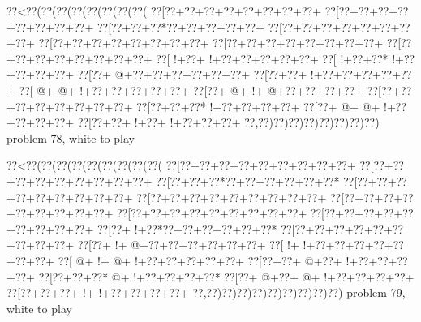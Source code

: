 \vbox{\vbox{\goo
\0??<\0??(\0??(\0??(\0??(\0??(\0??(\0??(\0??(
\0??[\0??+\0??+\0??+\0??+\0??+\0??+\0??+\0??+
\0??[\0??+\0??+\0??+\0??+\0??+\0??+\0??+\0??+
\0??[\0??+\0??+\0??*\0??+\0??+\0??+\0??+\0??+
\0??[\0??+\0??+\0??+\0??+\0??+\0??+\0??+\0??+
\0??[\0??+\0??+\0??+\0??+\0??+\0??+\0??+\0??+
\0??[\0??+\0??+\0??+\0??+\0??+\0??+\0??+\0??+
\0??[\0??+\0??+\0??+\0??+\0??+\0??+\0??+\0??+
\0??[\- !+\0??+\- !+\0??+\0??+\0??+\0??+\0??+
\0??[\- !+\0??+\0??*\- !+\0??+\0??+\0??+\0??+
\0??[\0??+\- @+\0??+\0??+\0??+\0??+\0??+\0??+
\0??[\0??+\0??+\- !+\0??+\0??+\0??+\0??+\0??+
\0??[\- @+\- @+\- !+\0??+\0??+\0??+\0??+\0??+
\0??[\0??+\- @+\- !+\- @+\0??+\0??+\0??+\0??+
\0??[\0??+\0??+\0??+\0??+\0??+\0??+\0??+\0??+
\0??[\0??+\0??+\0??*\- !+\0??+\0??+\0??+\0??+
\0??[\0??+\- @+\- @+\- !+\0??+\0??+\0??+\0??+
\0??[\0??+\0??+\- !+\0??+\- !+\0??+\0??+\0??+
\0??,\0??)\0??)\0??)\0??)\0??)\0??)\0??)\0??)
}
\hfil problem 78, white to play\hfil\break
}

\vbox{\vbox{\goo
\0??<\0??(\0??(\0??(\0??(\0??(\0??(\0??(\0??(\0??(
\0??[\0??+\0??+\0??+\0??+\0??+\0??+\0??+\0??+\0??+
\0??[\0??+\0??+\0??+\0??+\0??+\0??+\0??+\0??+\0??+
\0??[\0??+\0??+\0??*\0??+\0??+\0??+\0??+\0??+\0??*
\0??[\0??+\0??+\0??+\0??+\0??+\0??+\0??+\0??+\0??+
\0??[\0??+\0??+\0??+\0??+\0??+\0??+\0??+\0??+\0??+
\0??[\0??+\0??+\0??+\0??+\0??+\0??+\0??+\0??+\0??+
\0??[\0??+\0??+\0??+\0??+\0??+\0??+\0??+\0??+\0??+
\0??[\0??+\0??+\0??+\0??+\0??+\0??+\0??+\0??+\0??+
\0??[\0??+\- !+\0??*\0??+\0??+\0??+\0??+\0??+\0??*
\0??[\0??+\0??+\0??+\0??+\0??+\0??+\0??+\0??+\0??+
\0??[\0??+\- !+\- @+\0??+\0??+\0??+\0??+\0??+\0??+
\0??[\- !+\- !+\0??+\0??+\0??+\0??+\0??+\0??+\0??+
\0??[\- @+\- !+\- @+\- !+\0??+\0??+\0??+\0??+\0??+
\0??[\0??+\0??+\- @+\0??+\- !+\0??+\0??+\0??+\0??+
\0??[\0??+\0??+\0??*\- @+\- !+\0??+\0??+\0??+\0??*
\0??[\0??+\- @+\0??+\- @+\- !+\0??+\0??+\0??+\0??+
\0??[\0??+\0??+\0??+\- !+\- !+\0??+\0??+\0??+\0??+
\0??,\0??)\0??)\0??)\0??)\0??)\0??)\0??)\0??)\0??)
}
\hfil problem 79, white to play\hfil\break
}

